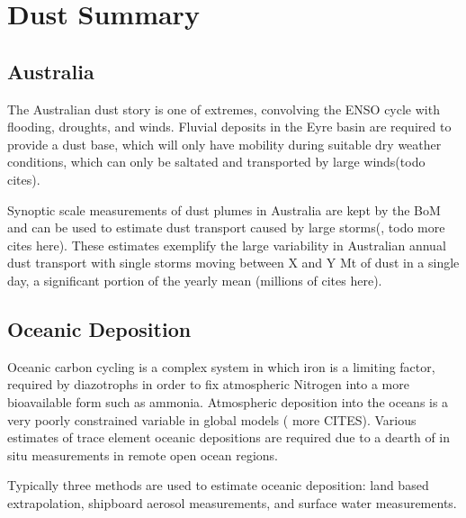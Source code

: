 \section{Dust Summary}

\subsection{Australia}

The Australian dust story is one of extremes, convolving the ENSO cycle with flooding, droughts, and winds.
Fluvial deposits in the Eyre basin are required to provide a dust base, which will only have mobility during suitable dry weather conditions, which can only be saltated and transported by large winds(todo cites).

Synoptic scale measurements of dust plumes in Australia are kept by the BoM and can be used to estimate dust transport caused by large storms(\cite{Leys_2011}, todo more cites here). 
These estimates exemplify the large variability in Australian annual dust transport with single storms moving between X and Y Mt of dust in a single day, a significant portion of the yearly mean (millions of cites here).

\subsection{Oceanic Deposition}
Oceanic carbon cycling is a complex system in which iron is a limiting factor, required by diazotrophs in order to fix atmospheric Nitrogen into a more bioavailable form such as ammonia. 
Atmospheric deposition into the oceans is a very poorly constrained variable in global models (\cite{Grand_2015} more CITES). 
Various estimates of trace element oceanic depositions are required due to a dearth of in situ measurements in remote open ocean regions.

Typically three methods are used to estimate oceanic deposition: land based extrapolation, shipboard aerosol measurements, and surface water measurements. 